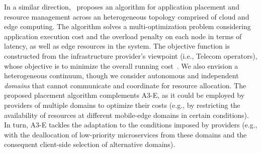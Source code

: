 

In a similar direction,~\cite{Tarneberg2017} proposes an algorithm for application placement and resource management across an heterogeneous topology comprised of cloud and edge computing. 
The algorithm solves a multi-optimization problem considering application
execution cost and the overload penalty on each node in terms of latency, as well as edge resources in the system. The objective function is constructed from the infrastructure provider's viewpoint (i.e., Telecom operators), whose objective is to minimize the overall running cost~\cite{weber2017facilitating}. We also envision a heterogeneous continuum, though we consider autonomous and independent \textit{domains} that cannot communicate and coordinate for resource allocation. The proposed placement algorithm complements A3-E, as it could be employed by providers of multiple domains to optimize their costs (e.g., by restricting the availability of resources at different mobile-edge domains in certain conditions). In turn, A3-E tackles the adaptation to the conditions imposed by providers (e.g., with the deallocation of low-priority microservices from these domains and the consequent client-side selection of alternative domains).

